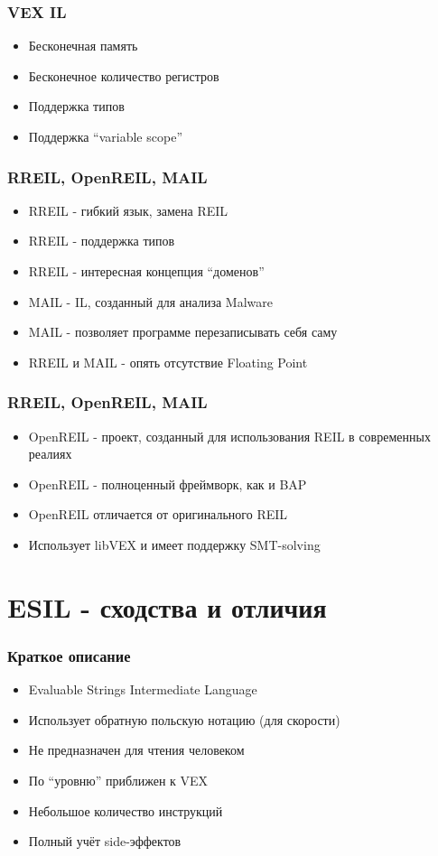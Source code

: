 \documentclass[10pt,pdf,utf8,english,compress,hyperref={unicode}]{beamer}
\begin{document}
\begin{frame}[fragile]
  \frametitle{VEX IL}
  \begin{itemize}
  \item Бесконечная память
  \item Бесконечное количество регистров
  \item Поддержка типов
  \item Поддержка ``variable scope''
  \end{itemize}
\end{frame}

\begin{frame}[fragile]
  \frametitle{RREIL, OpenREIL, MAIL}
  \begin{itemize}
  \item RREIL  - гибкий язык, замена REIL
  \item RREIL - поддержка типов
  \item RREIL - интересная концепция ``доменов''
  \item MAIL - IL, созданный для анализа Malware
  \item MAIL - позволяет программе перезаписывать себя саму
  \item RREIL и MAIL - опять отсутствие Floating Point
  \end{itemize}
\end{frame}

\begin{frame}[fragile]
  \frametitle{RREIL, OpenREIL, MAIL}
  \begin{itemize}
  \item OpenREIL  - проект, созданный для использования REIL в современных реалиях
  \item OpenREIL - полноценный фреймворк, как и BAP
  \item OpenREIL отличается от оригинального REIL
  \item Использует libVEX и имеет поддержку SMT-solving
  \end{itemize}
\end{frame}


\section{ESIL - сходства и отличия}

\begin{frame}[fragile]
  \frametitle{Краткое описание}
     \begin{itemize}
        \item Evaluable Strings Intermediate Language 
		\item Использует обратную польскую нотацию (для скорости)
		\item Не предназначен для чтения человеком
		\item По ``уровню'' приближен к VEX
		\item Небольшое количество инструкций
		\item Полный учёт side-эффектов
      \end{itemize}
\end{frame}
\end{document}
